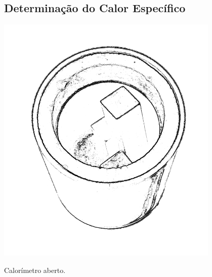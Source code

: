 \subsection{Determinação do Calor Específico}

\begin{marginfigure}[2cm]
	\centering
	\includegraphics[width=0.8\textwidth]{Ilustrations/Calorimetro.png}
	\caption{Calorímetro aberto.}
\end{marginfigure}

